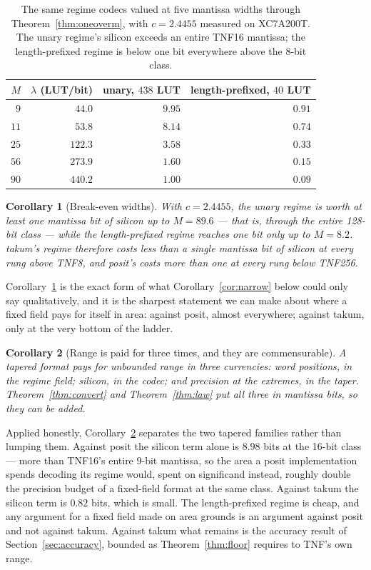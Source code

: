 \documentclass[11pt]{article}
\newtheorem{corollary}{Corollary}
\theoremstyle{definition}
\begin{document}
\begin{table}[t]\centering
\caption{The same regime codecs valued at five mantissa widths through
Theorem~\ref{thm:oneoverm}, with $c = 2.4455$ measured on XC7A200T. The unary
regime's silicon exceeds an entire TNF16 mantissa; the length-prefixed regime is
below one bit everywhere above the 8-bit class.}
\label{tab:oneoverm}
\begin{tabular}{rrrr}
\toprule
$M$ & $\lambda$ (LUT/bit) & unary, $438$ LUT & length-prefixed, $40$ LUT \\
\midrule
$9$  & $44.0$  & $\mathbf{9.95}$ & $0.91$ \\
$11$ & $53.8$  & $8.14$ & $0.74$ \\
$25$ & $122.3$ & $3.58$ & $0.33$ \\
$56$ & $273.9$ & $1.60$ & $0.15$ \\
$90$ & $440.2$ & $1.00$ & $0.09$ \\
\bottomrule
\end{tabular}
\end{table}

\begin{corollary}[Break-even widths]
\label{cor:breakeven}
With $c = 2.4455$, the unary regime is worth at least one mantissa bit of silicon
up to $M = 89.6$ --- that is, through the entire 128-bit class --- while the
length-prefixed regime reaches one bit only up to $M = 8.2$. takum's regime
therefore costs less than a single mantissa bit of silicon at every rung above
TNF8, and posit's costs more than one at every rung below TNF256.
\end{corollary}

Corollary~\ref{cor:breakeven} is the exact form of what
Corollary~\ref{cor:narrow} below could only say qualitatively, and it is the sharpest
statement we can make about where a fixed field pays for itself in area: against
posit, almost everywhere; against takum, only at the very bottom of the ladder.

\begin{corollary}[Range is paid for three times, and they are commensurable]
\label{cor:three}
A tapered format pays for unbounded range in three currencies: word positions,
in the regime field; silicon, in the codec; and precision at the extremes, in the
taper. Theorem~\ref{thm:convert} and Theorem~\ref{thm:law} put all three in
mantissa bits, so they can be added.
\end{corollary}

Applied honestly, Corollary~\ref{cor:three} separates the two tapered families
rather than lumping them. Against posit the silicon term alone is $8.98$ bits at
the 16-bit class --- more than TNF16's entire $9$-bit mantissa, so the area a
posit implementation spends decoding its regime would, spent on significand
instead, roughly double the precision budget of a fixed-field format at the same
class. Against takum the silicon term is $0.82$ bits, which is small. The
length-prefixed regime is cheap, and any argument for a fixed field made on area
grounds is an argument against posit and not against takum. Against takum what
remains is the accuracy result of Section~\ref{sec:accuracy}, bounded as
Theorem~\ref{thm:floor} requires to TNF's own range.
\end{document}
